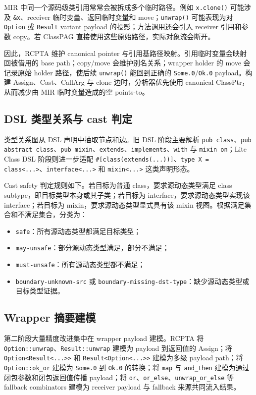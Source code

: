 \documentclass[10.5pt,compsoc,UTF8]{cjc}
\theoremstyle{mystyle}
\begin{document}
MIR 中同一个源码级类引用常常会被拆成多个临时路径。例如 \texttt{x.clone()} 可能涉及 \texttt{\&x}、receiver 临时变量、返回临时变量和 move；\texttt{unwrap()} 可能表现为对 \texttt{Option} 或 \texttt{Result} variant payload 的投影；方法调用还会引入 receiver 引用和参数 copy。若 ClassPAG 直接使用这些原始路径，实际对象流会断开。

因此，RCPTA 维护 canonical pointer 与引用基路径映射。引用临时变量会映射回被借用的 base path；copy/move 会维护别名关系；wrapper holder 的 move 会记录原始 holder 路径，使后续 \texttt{unwrap()} 能回到正确的 \texttt{Some.0}/\texttt{Ok.0} payload。构建 Assign、Cast、CallArg 与 clone 边时，分析器优先使用 canonical ClassPtr，从而减少由 MIR 临时变量造成的空 points-to。

\subsection{DSL 类型关系与 cast 判定}

类型关系图从 DSL 声明中抽取节点和边。旧 DSL 阶段主要解析 \texttt{pub class}、\texttt{pub abstract class}、\texttt{pub mixin}、\texttt{extends}、\texttt{implements}、\texttt{with} 与 \texttt{mixin on}；Lite Class DSL 阶段则进一步适配 \texttt{\#[class(extends(...))]}、\texttt{type X = class<...>}、\texttt{interface<...>} 和 \texttt{mixin<...>} 这类声明形态。

Cast safety 判定规则如下。若目标为普通 class，要求源动态类型满足 class subtype，即目标类型本身或其子类；若目标为 interface，要求源动态类型实现该 interface；若目标为 mixin，要求源动态类型显式具有该 mixin 视图。根据满足集合和不满足集合，分类为：

\begin{itemize}
    \item \texttt{safe}：所有源动态类型都满足目标类型；
    \item \texttt{may-unsafe}：部分源动态类型满足，部分不满足；
    \item \texttt{must-unsafe}：所有源动态类型都不满足；
    \item \texttt{boundary-unknown-src} 或 \texttt{boundary-missing-dst-type}：缺少源动态类型或目标类型证据。
\end{itemize}

\subsection{Wrapper 摘要建模}

第二阶段大量精度改进集中在 wrapper payload 建模。RCPTA 将 \texttt{Option::unwrap}、\texttt{Result::unwrap} 建模为 payload 到返回值的 Assign；将 \texttt{Option<Result<...>>} 和 \texttt{Result<Option<...>>} 建模为多级 payload path；将 \texttt{Option::ok\_or} 建模为 \texttt{Some.0} 到 \texttt{Ok.0} 的转换；将 \texttt{map} 与 \texttt{and\_then} 建模为通过闭包参数和闭包返回值传播 payload；将 \texttt{or}、\texttt{or\_else}、\texttt{unwrap\_or\_else} 等 fallback combinators 建模为 receiver payload 与 fallback 来源共同流入结果。
\end{document}
